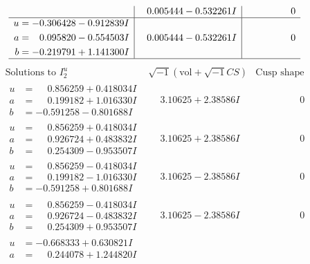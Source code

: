 \documentclass[1p]{elsarticle_modified}
\theoremstyle{definition}
\newcommand{\I}{\sqrt{-1}}
\begin{document}
$$\begin{array}{c|c|c}
 & \phantom{-}0.005444 - 0.532261 I & \phantom{-0.000000 } 0 \\ \hline\begin{aligned}
u &= -0.306428 - 0.912839 I \\
a &= \phantom{-}0.095820 - 0.554503 I \\
b &= -0.219791 + 1.141300 I\end{aligned}
 & \phantom{-}0.005444 - 0.532261 I & \phantom{-0.000000 } 0\\
 \hline 
 \end{array}$$\newpage$$\begin{array}{c|c|c}  
\text{Solutions to }I^u_{2}& \I (\text{vol} + \sqrt{-1}CS) & \text{Cusp shape}\\
 \hline 
\begin{aligned}
u &= \phantom{-}0.856259 + 0.418034 I \\
a &= \phantom{-}0.199182 + 1.016330 I \\
b &= -0.591258 - 0.801688 I\end{aligned}
 & \phantom{-}3.10625 + 2.38586 I & \phantom{-0.000000 } 0 \\ \hline\begin{aligned}
u &= \phantom{-}0.856259 + 0.418034 I \\
a &= \phantom{-}0.926724 + 0.483832 I \\
b &= \phantom{-}0.254309 - 0.953507 I\end{aligned}
 & \phantom{-}3.10625 + 2.38586 I & \phantom{-0.000000 } 0 \\ \hline\begin{aligned}
u &= \phantom{-}0.856259 - 0.418034 I \\
a &= \phantom{-}0.199182 - 1.016330 I \\
b &= -0.591258 + 0.801688 I\end{aligned}
 & \phantom{-}3.10625 - 2.38586 I & \phantom{-0.000000 } 0 \\ \hline\begin{aligned}
u &= \phantom{-}0.856259 - 0.418034 I \\
a &= \phantom{-}0.926724 - 0.483832 I \\
b &= \phantom{-}0.254309 + 0.953507 I\end{aligned}
 & \phantom{-}3.10625 - 2.38586 I & \phantom{-0.000000 } 0 \\ \hline\begin{aligned}
u &= -0.668333 + 0.630821 I \\
a &= \phantom{-}0.244078 + 1.244820 I \\

\end{aligned}
\end{array}$$
\end{document}
